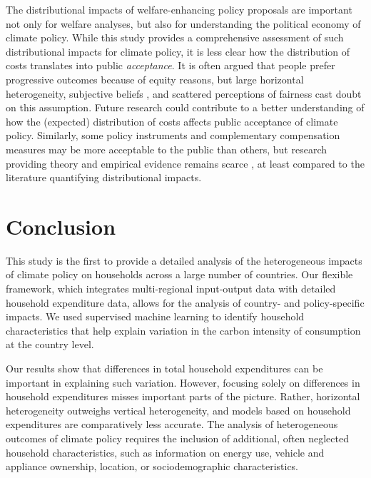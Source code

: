 \documentclass[12pt, a4paper]{article}
\begin{document}
The distributional impacts of welfare-enhancing policy proposals are important not only for welfare analyses, but also for understanding the political economy of climate policy. While this study provides a comprehensive assessment of such distributional impacts for climate policy, it is less clear how the distribution of costs translates into public \textit{acceptance}. It is often argued that people prefer progressive outcomes because of equity reasons, but large horizontal heterogeneity, subjective beliefs \autocite{Douenne.2020}, and scattered perceptions of fairness \autocite{MaestreAndres.2019,Povitkina.2021} cast doubt on this assumption. Future research could contribute to a better understanding of how the (expected) distribution of costs affects public acceptance of climate policy. Similarly, some policy instruments and complementary compensation measures may be more acceptable to the public than others, but research providing theory and empirical evidence remains scarce \autocite[e.g.,][]{Sommer.2022,Valencia.2023}, at least compared to the literature quantifying distributional impacts. 

\section{Conclusion} \label{sec:conclusion}

This study is the first to provide a detailed analysis of the heterogeneous impacts of climate policy on households across a large number of countries. Our flexible framework, which integrates multi-regional input-output data with detailed household expenditure data, allows for the analysis of country- and policy-specific impacts. We used supervised machine learning to identify household characteristics that help explain variation in the carbon intensity of consumption at the country level.

Our results show that differences in total household expenditures can be important in explaining such variation. However, focusing solely on differences in household expenditures misses important parts of the picture. Rather, horizontal heterogeneity outweighs vertical heterogeneity, and models based on household expenditures are comparatively less accurate. The analysis of heterogeneous outcomes of climate policy requires the inclusion of additional, often neglected household characteristics, such as information on energy use, vehicle and appliance ownership, location, or sociodemographic characteristics.
\end{document}
